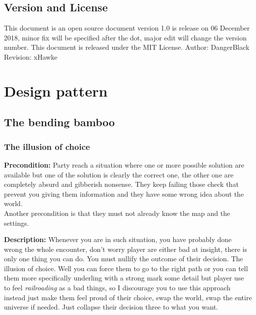 \documentclass[letterpaper,10pt,twoside,twocolumn,openany]{book}
\begin{document}
\subsection{Version and License}
This document is an open source document version 1.0 is release on 06 December 2018, minor fix will be specified after the dot, major edit will change the version number.
This document is released under the MIT License.
\newline
Author: DangerBlack
\newline
Revision: xHawke

\section{Design pattern}

\subsection{The bending bamboo}
\subsubsection{The illusion of choice}
\textbf{Precondition:} Party reach a situation where one or more possible solution are available but one of the solution is clearly the correct one, the other one are completely absurd and gibberish nonsense. They keep failing those check that prevent you giving them information and they have some wrong idea about the world. \\
Another precondition is that they must not already know the map and the settings.
\newline
\begin{figure}[h]
\centering
{}
\end{figure}

\noindent
\textbf{Description:} Whenever you are in such situation, you have probably done wrong the whole encounter, don't worry player are either bad at insight, there is only one thing you can do. You must nullify the outcome of their decision. The illusion of choice. Well you can force them to go to the right path or you can tell them more specifically underling with a strong mark some detail but player use to feel \textit{railroading} as a bad things, so I discourage you to use this approach instead just make them feel proud of their choice, swap the world, swap the entire universe if needed. Just collapse their decision three to what you want.
\end{document}
